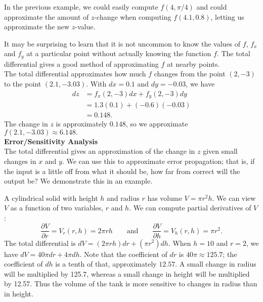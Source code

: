 In the previous example, we could easily compute $f(4,\pi/4)$ and could approximate the amount of $z$-change when computing $f(4.1,0.8)$, letting us approximate the new $z$-value.

It may be surprising to learn that it is not uncommon to know the values of $f$, $f_x$ and $f_y$ at a particular point without actually knowing the function $f$. The total differential gives a good method of approximating $f$ at nearby points.\\

{The total differential approximates how much $f$ changes from the point $(2,-3)$ to the point $(2.1,-3.03)$. With $dx = 0.1$ and $dy = -0.03$, we have
\begin{align*}
dz &= f_x(2,-3)dx + f_y(2,-3)dy\\
		&= 1.3(0.1) + (-0.6)(-0.03) \\
		&= 0.148.
\end{align*}
The change in $z$ is approximately $0.148$, so we approximate $f(2.1,-3.03)\approx 6.148.$
}\\

\noindent\textbf{\large Error/Sensitivity Analysis}\\

The total differential gives an approximation of the change in $z$ given small changes in $x$ and $y$. We can use this to approximate error propagation; that is, if the input is a little off from what it should be, how far from correct will the output be? We demonstrate this in an example.\\

{A cylindrical solid with height $h$ and radius $r$ has volume $V = \pi r^2h$. We can view $V$ as a function of two variables, $r$ and $h$. We can compute partial derivatives of $V$:
$$\frac{\partial V}{\partial r} = V_r(r,h) = 2\pi rh \qquad \text{and}\qquad \frac{\partial V}{\partial h} = V_h(r,h) = \pi r^2.$$
The total differential is $dV = (2\pi rh)dr + (\pi r^2)dh.$ When $h = 10$ and $r = 2$, we have $dV = 40\pi dr + 4\pi dh$.
Note that the coefficient of $dr$ is $40\pi\approx 125.7$; the coefficient of $dh$ is a tenth of that, approximately $12.57$. A small change in radius will be multiplied by 125.7, whereas a small change in height will be multiplied by 12.57. Thus the volume of the tank is more sensitive to changes in radius than in height.
}\\

